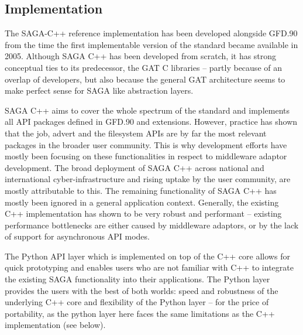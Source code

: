 \documentclass{article}
\begin{document}
 \subsection{Implementation}

  The SAGA-C++ reference implementation has been developed alongside
  GFD.90 from the time the first implementable version of the standard
  became available in 2005. Although SAGA C++ has been developed from
  scratch, it has strong conceptual ties to its predecessor, the GAT
  C libraries -- partly because of an overlap of developers, but also
  because the general GAT architecture seems to make perfect sense for
  SAGA like abstraction layers.

  SAGA C++ aims to cover the whole spectrum of the standard and
  implements all API packages defined in GFD.90 and extensions.
  However, practice has shown that the job, advert and the filesystem
  APIs are by far the most relevant packages in the broader user
  community.  This is why development efforts have mostly been
  focusing on these functionalities in respect to middleware adaptor
  development.  The broad deployment of SAGA C++ across national and
  international cyber-infrastructure and rising uptake by the user
  community, are mostly attributable to this. The remaining
  functionality of SAGA C++ has mostly been ignored in a general
  application context.  Generally, the existing C++ implementation has
  shown to be very robust and performant -- existing performance
  bottlenecks are either caused by middleware adaptors, or by the lack
  of support for asynchronous API modes.  
  
  The Python API layer which is implemented on top of the C++ core
  allows for quick prototyping and enables users who are not familiar
  with C++ to integrate the existing SAGA functionality into their
  applications.  The Python layer provides the users with the best of
  both worlds: speed and robustness of the underlying C++ core and
  flexibility of the Python layer -- for the price of portability, as
  the python layer here faces the same limitations as the C++
  implementation (see below).
\end{document}
